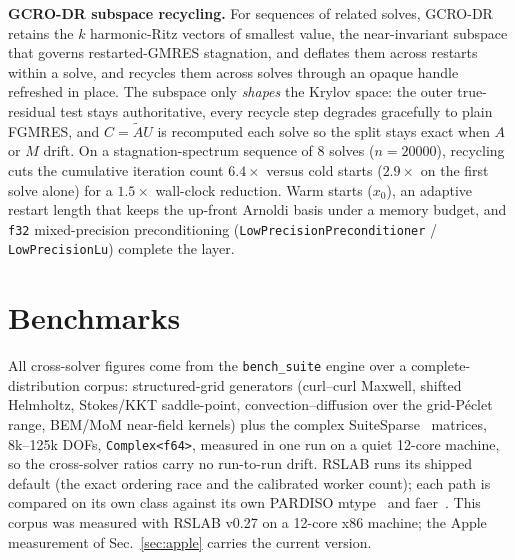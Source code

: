 \documentclass[11pt,a4paper]{article}
\newcommand{\code}[1]{\texttt{\small #1}}
\begin{document}
\textbf{GCRO-DR subspace recycling.} For sequences of related solves,
GCRO-DR~\cite{gcrodr,morgan} retains the $k$ harmonic-Ritz vectors of smallest value,
the near-invariant subspace that governs restarted-GMRES stagnation, and deflates them
across restarts within a solve, and recycles them across solves through an opaque
handle refreshed in place. The subspace only \emph{shapes} the Krylov space: the outer
true-residual test stays authoritative, every recycle step degrades gracefully to plain
FGMRES, and $C=\tilde AU$ is recomputed each solve so the split stays exact when $A$ or
$M$ drift. On a stagnation-spectrum sequence of 8 solves ($n=\num{20000}$), recycling
cuts the cumulative iteration count $6.4\times$ versus cold starts ($2.9\times$ on the
first solve alone) for a $1.5\times$ wall-clock reduction. Warm starts ($x_0$), an
adaptive restart length that keeps the up-front Arnoldi basis under a memory budget, and
\code{f32} mixed-precision preconditioning (\code{LowPrecisionPreconditioner} /
\code{LowPrecisionLu}) complete the layer.

\section{Benchmarks}
\label{sec:eval}
All cross-solver figures come from the \code{bench\_suite} engine over a
complete-distribution corpus: structured-grid generators (curl--curl Maxwell,
shifted Helmholtz, Stokes/KKT saddle-point, convection--diffusion over the grid-P\'eclet
range, BEM/MoM near-field kernels) plus the complex SuiteSparse~\cite{suitesparse}
matrices, 8k--125k DOFs, \code{Complex<f64>}, measured in one run on a quiet 12-core
machine, so the cross-solver ratios carry no run-to-run drift. RSLAB runs its shipped
default (the exact ordering race and the calibrated worker count); each path is compared
on its own class against its own PARDISO mtype~\cite{pardiso} and faer~\cite{faer}.
This corpus was measured with RSLAB v0.27 on a 12-core x86 machine; the Apple
measurement of Sec.~\ref{sec:apple} carries the current version.
\end{document}
